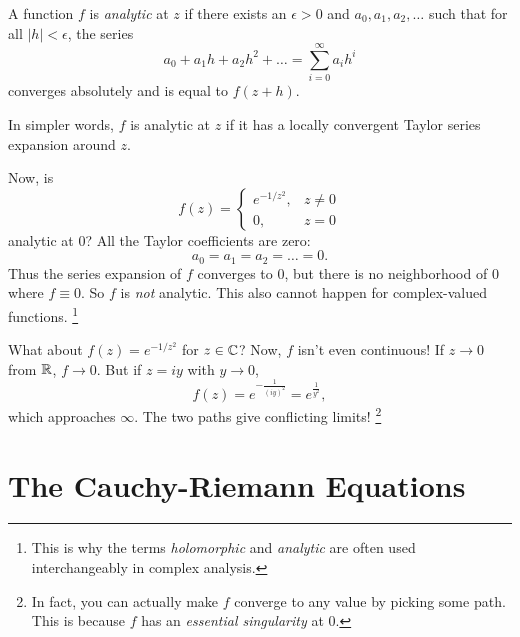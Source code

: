 \begin{tcolorbox}[title=Definition (Analytic)]
  A function $f$ is \textit{analytic} at $z$ if there
  exists an $\epsilon > 0$ and $a_0, a_1, a_2, \dots$
  such that for all $|h| < \epsilon$, the series
  \[
  a_0 + a_1 h + a_2 h^2 + \dots
  = \sum_{i = 0}^{\infty} a_i h^i
  \] 
  converges absolutely and is equal to $f(z + h)$.
\end{tcolorbox}

In simpler words, $f$ is analytic at $z$ if it has a
locally convergent Taylor series expansion around $z$.

Now, is
\[
f(z) =
\begin{cases}
  e^{-1 / z^2}, & z \neq 0 \\
  0, & z = 0
\end{cases}
\] 
analytic at $0$? All the Taylor coefficients
are zero:
\[
  a_0 = a_1 = a_2 = \dots = 0
.\]
Thus the series expansion of $f$ converges to $0$, but
there is no neighborhood of $0$ where $f \equiv 0$.
So $f$ is \textit{not} analytic. This also cannot
happen for complex-valued functions.
\footnote{This is why the terms \textit{holomorphic} and
\textit{analytic} are often used interchangeably in
  complex analysis.}

What about $f(z) = e^{-1 / z^2}$ for $z \in \mathbb{C}$?
Now, $f$ isn't even continuous! If $z \to 0$
from $\mathbb{R}$, $f \to 0$. But if $z = iy$ with $y \to 0$,
\[f(z) = e^{-\frac{1}{(iy)^2}} = e^{\frac{1}{y^2}},\]
which approaches $\infty$. The two paths give conflicting
limits!
\footnote{In fact, you can actually make $f$ converge to
  any value by picking some path. This is because $f$
  has an \textit{essential singularity} at $0$.}

\section{The Cauchy-Riemann Equations}
